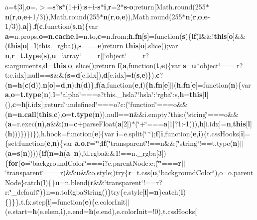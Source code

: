 {{a}={\bf t}\mbox{[}3\mbox{]},{\bf o}=.$>$={\bf s}?{\bf s}$\ast$(1+{\bf i})\+:{\bf s}+{\bf i}-\/{\bf s}$\ast${\bf i},{\bf r}=2$\ast${\bf s}-\/{\bf o};return\mbox{[}Math.\+round(255$\ast${\bf n}({\bf r},{\bf o},{\bf e}+1/3)),Math.\+round(255$\ast${\bf n}({\bf r},{\bf o},{\bf e})),Math.\+round(255$\ast${\bf n}({\bf r},{\bf o},{\bf e}-\/1/3)),{\bf a}\mbox{]}\},{\bf f}({\bf c},function({\bf s},{\bf n})\{var {\bf a}=n.\+props,{\bf o}={\bf n.\+cache},{\bf l}=n.\+to,{\bf c}=n.\+from;{\bf h.\+fn}\mbox{[}{\bf s}\mbox{]}=function({\bf s})\{{\bf if}({\bf l}\&\&!{\bf this}\mbox{[}{\bf o}\mbox{]}\&\&({\bf this}\mbox{[}{\bf o}\mbox{]}={\bf l}(this.\+\_\+rgba)),{\bf s}==={\bf e})return {\bf this}\mbox{[}{\bf o}\mbox{]}.slice();var {\bf n},{\bf r}={\bf t.\+type}({\bf s}),{\bf u}=\char`\"{}array\char`\"{}===r$\vert$$\vert$\char`\"{}object\char`\"{}===r?s\+:arguments,{\bf d}={\bf this}\mbox{[}{\bf o}\mbox{]}.slice();return {\bf f}({\bf a},function({\bf t},{\bf e})\{var {\bf s}={\bf u}\mbox{[}\char`\"{}object\char`\"{}===r?t\+:e.\+idx\mbox{]};null=={\bf s}\&\&({\bf s}={\bf d}\mbox{[}e.\+idx\mbox{]}),{\bf d}\mbox{[}e.\+idx\mbox{]}={\bf i}({\bf s},{\bf e})\}),{\bf c}?({\bf n}={\bf h}({\bf c}({\bf d})),{\bf n}\mbox{[}{\bf o}\mbox{]}={\bf d},{\bf n})\+:{\bf h}({\bf d})\},{\bf f}({\bf a},function({\bf e},{\bf i})\{{\bf h.\+fn}\mbox{[}{\bf e}\mbox{]}$\vert$$\vert$({\bf h.\+fn}\mbox{[}{\bf e}\mbox{]}=function({\bf n})\{var {\bf a},{\bf o}={\bf t.\+type}({\bf n}),{\bf l}=\char`\"{}alpha\char`\"{}===e?this.\+\_\+hsla?\char`\"{}hsla\char`\"{}\+:\char`\"{}rgba\char`\"{}\+:s,{\bf h}={\bf this}\mbox{[}{\bf l}\mbox{]}(),{\bf c}={\bf h}\mbox{[}i.\+idx\mbox{]};return\char`\"{}undefined\char`\"{}===o?c\+:(\char`\"{}function\char`\"{}===o\&\&({\bf n}={\bf n.\+call}({\bf this},{\bf c}),{\bf o}={\bf t.\+type}({\bf n})),null=={\bf n}\&\&i.\+empty?this\+:(\char`\"{}string\char`\"{}===o\&\&({\bf a}=r.\+exec({\bf n}),{\bf a}\&\&({\bf n}={\bf c}+parse\+Float({\bf a}\mbox{[}2\mbox{]})$\ast$(\char`\"{}+\char`\"{}==={\bf a}\mbox{[}1\mbox{]}?1\+:-\/1))),{\bf h}\mbox{[}i.\+idx\mbox{]}={\bf n},{\bf this}\mbox{[}{\bf l}\mbox{]}({\bf h})))\})\})\}),h.\+hook=function({\bf e})\{var {\bf i}=e.\+split(\char`\"{} \char`\"{});{\bf f}({\bf i},function({\bf e},{\bf i})\{t.\+css\+Hooks\mbox{[}{\bf i}\mbox{]}=\{set\+:function({\bf e},{\bf n})\{var {\bf a},{\bf o},{\bf r}=\char`\"{}\char`\"{};{\bf if}(\char`\"{}transparent\char`\"{}!==n\&\&(\char`\"{}string\char`\"{}!==t.\+type({\bf n})$\vert$$\vert$({\bf a}={\bf s}({\bf n}))))\{{\bf if}({\bf n}={\bf h}({\bf a}$\vert$$\vert${\bf n}),!d.\+rgba\&\&1!==n.\+\_\+rgba\mbox{[}3\mbox{]})\{{\bf for}({\bf o}=\char`\"{}background\+Color\char`\"{}===i?e.\+parent\+Node\+:e;(\char`\"{}\char`\"{}==={\bf r}$\vert$$\vert$\char`\"{}transparent\char`\"{}===r)\&\&{\bf o}\&\&o.\+style;)try\{{\bf r}=t.\+css({\bf o},\char`\"{}background\+Color\char`\"{}),o=o.\+parent\+Node\}catch({\bf l})\{\}{\bf n}=n.\+blend({\bf r}\&\&\char`\"{}transparent\char`\"{}!==r?r\+:\char`\"{}\+\_\+default\char`\"{})\}n=n.\+to\+Rgba\+String()\}try\{e.\+style\mbox{[}{\bf i}\mbox{]}={\bf n}\}catch({\bf l})\{\}\}\},t.\+fx.\+step\mbox{[}{\bf i}\mbox{]}=function({\bf e})\{e.\+color\+Init$\vert$$\vert$(e.\+start={\bf h}(e.\+elem,{\bf i}),e.\+end={\bf h}(e.\+end),e.\+color\+Init=!0),t.\+css\+Hooks\mbox{[}{\bf }}
